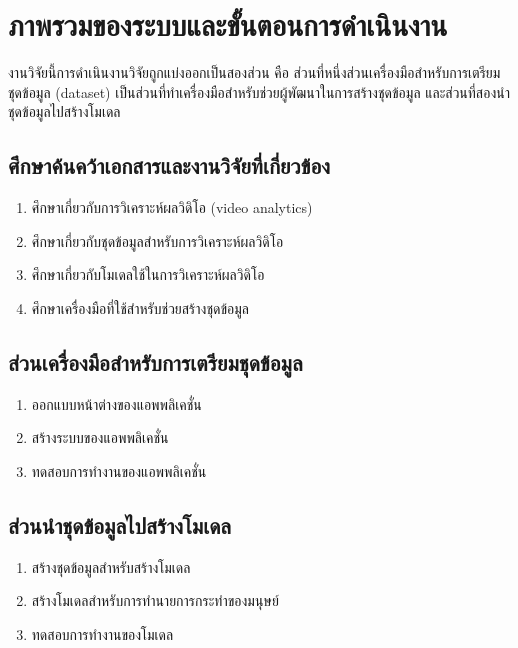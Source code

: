 \section{ภาพรวมของระบบและขั้นตอนการดำเนินงาน}
งานวิจัยนี้การดำเนินงานวิจัยถูกแบ่งออกเป็นสองส่วน คือ ส่วนที่หนึ่งส่วนเครื่องมือสำหรับการเตรียมชุดข้อมูล (dataset) เป็นส่วนที่ทำเครื่องมือสำหรับช่วยผู้พัฒนาในการสร้างชุดข้อมูล และส่วนที่สองนำชุดข้อมูลไปสร้างโมเดล
\subsection*{ศึกษาค้นคว้าเอกสารและงานวิจัยที่เกี่ยวข้อง}
\begin{enumerate}\setlength\itemsep{-0.25em}
	\item ศึกษาเกี่ยวกับการวิเคราะห์ผลวิดิโอ (video analytics)
	\item ศึกษาเกี่ยวกับชุดข้อมูลสำหรับการวิเคราะห์ผลวิดิโอ
	\item ศึกษาเกี่ยวกับโมเดลใช้ในการวิเคราะห์ผลวิดิโอ
	\item ศึกษาเครื่องมือที่ใช้สำหรับช่วยสร้างชุดข้อมูล
\end{enumerate}
\subsection*{ส่วนเครื่องมือสำหรับการเตรียมชุดข้อมูล}
\begin{enumerate}\setlength\itemsep{-0.25em}
	\item ออกแบบหน้าต่างของแอพพลิเคชั่น
	\item สร้างระบบของแอพพลิเคชั่น
	\item ทดสอบการทำงานของแอพพลิเคชั่น
\end{enumerate}
\subsection*{ส่วนนำชุดข้อมูลไปสร้างโมเดล}
\begin{enumerate}\setlength\itemsep{-0.25em}
	\item สร้างชุดข้อมูลสำหรับสร้างโมเดล
	\item สร้างโมเดลสำหรับการทำนายการกระทำของมนุษย์
	\item ทดสอบการทำงานของโมเดล
\end{enumerate}
\clearpage
